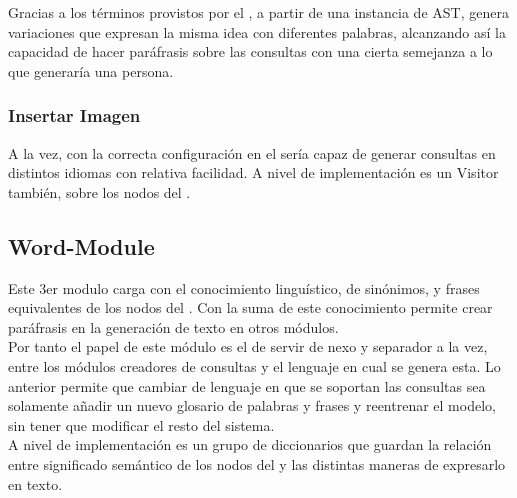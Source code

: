Gracias a los t\'erminos provistos por el , a partir de una instancia de AST, genera variaciones que expresan la misma idea con diferentes palabras, alcanzando as\'i la capacidad de hacer par\'afrasis sobre las consultas con una cierta semejanza a lo que generar\'ia una persona.
\subsubsection{Insertar Imagen}

A la vez, con la correcta configuraci\'on en el  sería capaz de generar consultas en distintos idiomas con relativa facilidad. A nivel de implementaci\'on es un Visitor tambi\'en, sobre los nodos del .

\subsection{Word-Module}
\label{word-m}

Este 3er modulo carga con el conocimiento lingu\'istico, de sinónimos, y frases equivalentes de los nodos del . Con la suma de este conocimiento permite crear par\'afrasis en la generaci\'on de texto en otros m\'odulos.\\

Por tanto el papel de este m\'odulo es el de servir de nexo y separador a la vez, entre los m\'odulos creadores de consultas y el lenguaje en cual se genera esta. Lo anterior permite que cambiar de lenguaje en que se soportan las consultas sea solamente añadir un nuevo glosario de palabras y frases y reentrenar el modelo, sin tener que modificar el resto del sistema.\\ 

A nivel de implementación es un grupo de diccionarios que guardan la relaci\'on entre significado sem\'antico de los nodos del  y las distintas maneras de expresarlo en texto. 
